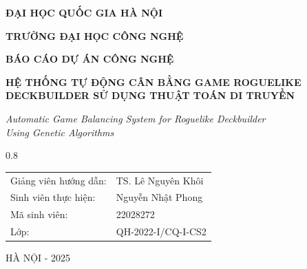 \begin{titlepage}
\begin{center}

\vspace*{1cm}

{\large \textbf{ĐẠI HỌC QUỐC GIA HÀ NỘI}}

{\large \textbf{TRƯỜNG ĐẠI HỌC CÔNG NGHỆ}}

\vspace{2cm}

{\Large \textbf{BÁO CÁO DỰ ÁN CÔNG NGHỆ}}

\vspace{1cm}

{\LARGE \textbf{HỆ THỐNG TỰ ĐỘNG CÂN BẰNG GAME ROGUELIKE DECKBUILDER SỬ DỤNG THUẬT TOÁN DI TRUYỀN}}

\vspace{0.5cm}

{\large \textit{Automatic Game Balancing System for Roguelike Deckbuilder\\
Using Genetic Algorithms}}

\vspace{3cm}

\centering
\begin{spacing}{0.8}
\begin{tabular}{ll}
Giảng viên hướng dẫn:  & TS. Lê Nguyên Khôi \\[1ex]
Sinh viên thực hiện:   & Nguyễn Nhật Phong \\[1ex]
Mã sinh viên:          & 22028272 \\[1ex]
Lớp:                   & QH-2022-I/CQ-I-CS2
\end{tabular}
\end{spacing}

\vfill

{\large HÀ NỘI - 2025}

\end{center}
\end{titlepage}
